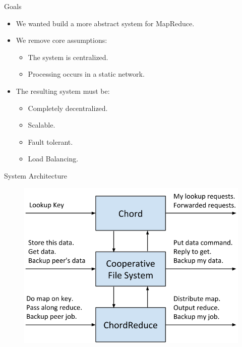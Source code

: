 \documentclass[11pt]{beamer}
\begin{document}
\begin{frame}{Goals}

	\begin{itemize}
		\item We wanted build a more abstract system for MapReduce.
		\item We remove core assumptions:
		\begin{itemize}
			\item The system is centralized.
			\item Processing occurs in a static network.
		\end{itemize}
		\item The resulting system must be:
		\begin{itemize}
			\item Completely decentralized.
			\item Scalable.
			\item Fault tolerant.
			\item Load Balancing.
		\end{itemize}
	\end{itemize}

\end{frame}


%
%
%

\begin{frame}{System Architecture}
	\begin{figure}
	    \includegraphics[width=0.8\linewidth]{figs/CR_architecture}
	
	\end{figure}
\end{frame}
\end{document}
